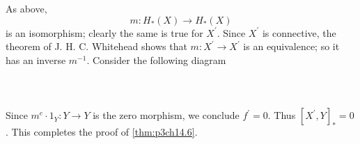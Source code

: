 \documentclass[../main]{subfiles}
\begin{document}
As above, 
$$
  m\colon  H_{\ast}(X)  \to  H_{\ast}(X)  
$$ 
is an isomorphism; clearly the same is true for $X^{\prime}$. Since $X^{\prime}$ is connective, the theorem of J. H. C. Whitehead shows that $m\colon  X^{\prime} \to  X^{\prime} $ is an equivalence; so it has an inverse $m^{-1}$. Consider the following diagram 
~\\~\\
~\\~\\
Since $m^{e}\cdot 1_{Y}\colon Y \to Y$ is the zero morphism, we conclude $f^{\prime}=0.$ Thus $\left[X^{\prime},Y\right]_{\ast}=0$. This completes the proof of \ref{thm:p3ch14.6}.
\end{document}
